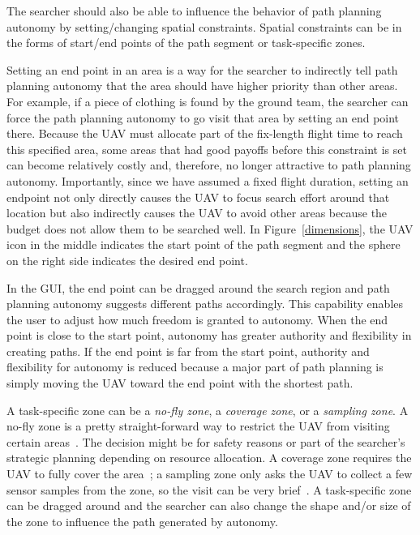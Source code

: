 The searcher should also be able to influence the behavior of path planning autonomy by setting/changing spatial constraints. Spatial constraints can be in the forms of start/end points of the path segment or task-specific zones.

Setting an end point in an area is a way for the searcher to indirectly tell path planning autonomy that the area should have higher priority than other areas. For example, if a piece of clothing is found by the ground team, the searcher can force the path planning autonomy to go visit that area by setting an end point there. Because the UAV must allocate part of the fix-length flight time to reach this specified area, some areas that had good payoffs before this constraint is set can become relatively costly and, therefore, no longer attractive to path planning autonomy. Importantly, since we have assumed a fixed flight duration, setting an endpoint not only directly causes the UAV to focus search effort around that location but also indirectly causes the UAV to avoid other areas because the budget does not allow them to be searched well. In Figure~\ref{dimensions}, the UAV icon in the middle indicates the start point of the path segment and the sphere on the right side indicates the desired end point. 

In the GUI, the end point can be dragged around the search region and path planning autonomy suggests different paths accordingly. This capability enables the user to adjust how much freedom is granted to autonomy. When the end point is close to the start point, autonomy has greater authority and flexibility in creating paths. If the end point is far from the start point, authority and flexibility for autonomy is reduced because a major part of path planning is simply moving the UAV toward the end point with the shortest path.

A task-specific zone can be a \textit{no-fly zone}, a \textit{coverage zone}, or a \textit{sampling zone}. A no-fly zone is a pretty straight-forward way to restrict the UAV from visiting certain areas~\cite{Clark2013Hierarchical,Jorris2009Three}. The decision might be for safety reasons or part of the searcher's strategic planning depending on resource allocation. A coverage zone requires the UAV to fully cover the area~\cite{Lin2009UAV}; a sampling zone only asks the UAV to collect a few sensor samples from the zone, so the visit can be very brief~\cite{Clark2013Hierarchical}. A task-specific zone can be dragged around and the searcher can also change the shape and/or size of the zone to influence the path generated by autonomy.


